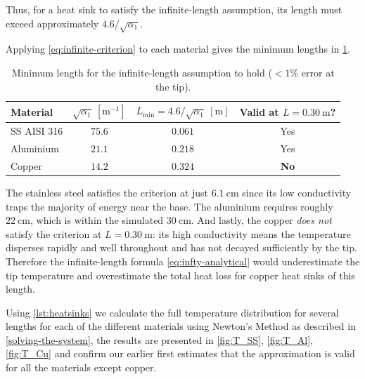 \documentclass[11pt, a4paper]{article}
\theoremstyle{definition}
\begin{document}
Thus, for a heat sink to satisfy the infinite-length assumption, its length must exceed approximately $4.6/\sqrt{\alpha_1}$.

Applying \cref{eq:infinite-criterion} to each material gives the minimum
lengths in \cref{tab:infinite-length}.

\begin{table}[H]
  \centering
  \begin{tabular}{@{}lccc@{}}
    \toprule
    Material     & $\sqrt{\alpha_1}\ [\mathrm{m}^{-1}]$
                 & $L_{\min} = 4.6/\sqrt{\alpha_1}\ [\mathrm{m}]$
                 & Valid at $L = 0.30\ \mathrm{m}$? \\
    \midrule
    SS AISI 316  & $75.6$ & $0.061$ & Yes \\
    Aluminium    & $21.1$ & $0.218$ & Yes \\
    Copper       & $14.2$ & $0.324$ & \textbf{No} \\
    \bottomrule
  \end{tabular}
  \caption{Minimum length for the infinite-length assumption to hold
  ($< 1\%$ error at the tip).}
  \label{tab:infinite-length}
\end{table}

The stainless steel satisfies the criterion at just $6.1\ \mathrm{cm}$
since its low conductivity traps the majority of energy near the base.
The aluminium requires roughly $22\ \mathrm{cm}$, which is within the simulated $30\ \mathrm{cm}$. And lastly, the copper \textit{does not} satisfy the criterion at $L = 0.30\ \mathrm{m}$: its high
conductivity means the temperature disperses rapidly and well throughout and has not decayed sufficiently by the tip.
Therefore the infinite-length formula \cref{eq:infty-analytical} would underestimate the
tip temperature and overestimate the total heat loss for copper heat sinks of this
length. 

Using \cref{lst:heatsinks} we calculate the full temperature distribution for several lengths for each of the different materials using Newton's Method as described in \cref{solving-the-system}, the results are presented in \cref{fig:T_SS}, \cref{fig:T_Al}, \cref{fig:T_Cu} and confirm our earlier first estimates that the approximation is valid for all the materials except copper.
\end{document}
